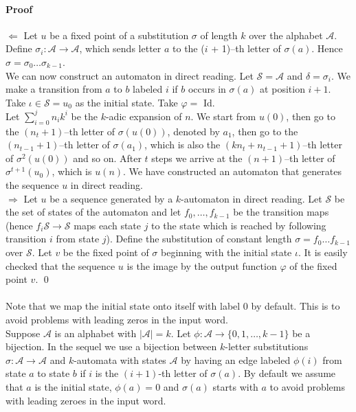 \documentclass{article}
\begin{document}
\paragraph{Proof}
$\Leftarrow$ Let $u$ be a fixed point of a substitution $\sigma$ of length
$k$ over the alphabet $\mathcal{A}$. Define
$\sigma_i: \mathcal{A} \to \mathcal{A}$, which sends letter $a$ to the
($i$ + 1)--th letter of $\sigma(a)$. Hence
$\sigma = \sigma_0 \ldots \sigma_{k - 1}$.\\
We can now construct an automaton in direct reading. Let $\mathcal{S = A}$ and
$\delta = \sigma_i$. We make a transition from $a$ to $b$ labeled $i$ if $b$
occurs in $\sigma(a)$ at position $i + 1$. Take $\iota \in \mathcal{S} = u_0$
as the initial state. Take $\varphi =$ Id.\\
Let $\sum_{i = 0}^j n_i k^i$ be the $k$-adic expansion of $n$. We start from 
$u(0)$, then go to the $(n_t + 1)$--th letter of $\sigma(u(0))$, denoted by 
$a_1$, then go to the $(n_{t - 1} + 1)$--th letter of $\sigma(a_1)$, which is 
also the $(kn_t + n_{t - 1} + 1)$--th letter of $\sigma^2(u(0))$ and so on.
After $t$ steps we arrive at the $(n + 1)$--th letter of $\sigma^{t + 1}(u_0)$,
which is $u(n)$. We have constructed an automaton that generates the sequence 
$u$ in direct reading.\\
$\Rightarrow$ Let $u$ be a sequence generated by a $k$-automaton in direct
reading. Let $\mathcal{S}$ be the set of states of the automaton and let
$f_0, \ldots, f_{k - 1}$ be the transition maps (hence 
$f_i \mathcal{S \to S}$ maps each state $j$ to the state which is 
reached by following transition $i$ from state $j$). Define the substitution 
of constant length $\sigma = f_0 \dots f_{k - 1}$ over $\mathcal{S}$. Let $v$ 
be the fixed point of $\sigma$ beginning with the initial state $\iota$. It is 
easily checked that the sequence $u$ is the image by the output function 
$\varphi$ of the fixed point $v$. \qed\\
\\
Note that we map the initial state onto itself with label 0 by default. This
is to avoid problems with leading zeros in the input word.\\
Suppose $\mathcal{A}$ is an alphabet with $|\mathcal{A}| = k$. Let 
$\phi: \mathcal{A} \to \{0, 1, \ldots, k - 1\}$ be a bijection. In the
sequel we use a bijection between $k$-letter substitutions 
$\sigma: \mathcal{A} \to \mathcal{A}$ and $k$-automata with states 
$\mathcal{A}$ by having an edge labeled $\phi(i)$ from state $a$ to state $b$ 
if $i$ is the $(i + 1)$-th letter of $\sigma(a)$. By default we assume that
$a$ is the initial state, $\phi(a) = 0$ and $\sigma(a)$ starts with $a$ to 
avoid problems with leading zeroes in the input word.
\end{document}
